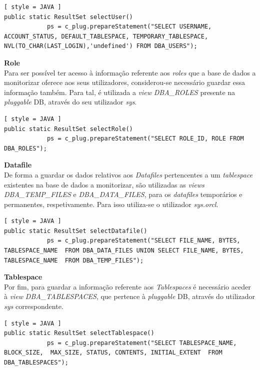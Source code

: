 \documentclass[a4paper]{article}
\begin{document}
\begin{lstlisting}[ style = JAVA ]
public static ResultSet selectUser() 
            ps = c_plug.prepareStatement("SELECT USERNAME, ACCOUNT_STATUS, DEFAULT_TABLESPACE, TEMPORARY_TABLESPACE, NVL(TO_CHAR(LAST_LOGIN),'undefined') FROM DBA_USERS");

\end{lstlisting}

\textbf{\large Role}\\

Para ser possível ter acesso à informação referente aos \emph{roles} que a base de dados a monitorizar oferece aos seus utilizadores, considerou-se necessário guardar essa informação também. Para tal, é utilizada a \emph{view} \emph{DBA\_ROLES} presente na \emph{pluggable} DB, através do seu utilizador \emph{sys}.

\begin{lstlisting}[ style = JAVA ]
public static ResultSet selectRole() 
            ps = c_plug.prepareStatement("SELECT ROLE_ID, ROLE FROM DBA_ROLES");

\end{lstlisting}

\textbf{\large Datafile}\\

De forma a guardar os dados relativos aos \emph{Datafiles} pertencentes a um \emph{tablespace} existentes na base de dados a monitorizar, são utilizadas as \emph{views} \emph{DBA\_TEMP\_FILES} e \emph{DBA\_DATA\_FILES}, para os \emph{datafiles} temporários e permanentes, respetivamente. Para isso utiliza-se o utilizador \emph{sys.orcl}.

\begin{lstlisting}[ style = JAVA ]
public static ResultSet selectDatafile() 
            ps = c_plug.prepareStatement("SELECT FILE_NAME, BYTES, TABLESPACE_NAME  FROM DBA_DATA_FILES UNION SELECT FILE_NAME, BYTES, TABLESPACE_NAME  FROM DBA_TEMP_FILES");

\end{lstlisting}

\textbf{\large Tablespace}\\

Por fim, para guardar a informação referente aos \emph{Tablespaces} é necessário aceder à \emph{view} \emph{DBA\_TABLESPACES}, que pertence à \emph{pluggable} DB, através do utilizador \emph{sys} correspondente.

\begin{lstlisting}[ style = JAVA ]
public static ResultSet selectTablespace() 
            ps = c_plug.prepareStatement("SELECT TABLESPACE_NAME, BLOCK_SIZE,  MAX_SIZE, STATUS, CONTENTS, INITIAL_EXTENT  FROM DBA_TABLESPACES");
\end{lstlisting}
\end{document}
